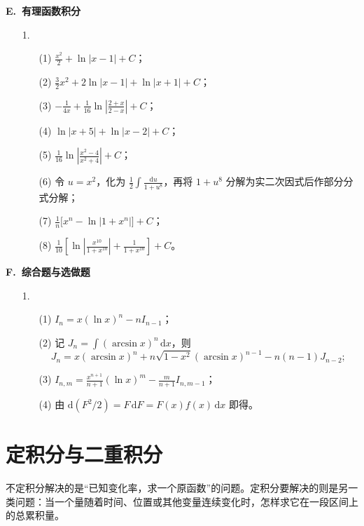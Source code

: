 \documentclass[fontset=fandol]{ctexart}
\newcommand{\dd}{\mathrm{d}}
\begin{document}
\textbf{E.\ 有理函数积分}

\begin{enumerate}
\item[1.]
\begin{enumerate}
\item[(1)] $\displaystyle \frac{x^2}{2}+\ln|x-1|+C$；
\item[(2)] $\displaystyle \frac32x^2+2\ln|x-1|+\ln|x+1|+C$；
\item[(3)] $\displaystyle -\frac1{4x}+\frac1{16}\ln\left|\frac{2+x}{2-x}\right|+C$；
\item[(4)] $\ln|x+5|+\ln|x-2|+C$；
\item[(5)] $\displaystyle \frac1{16}\ln\left|\frac{x^2-4}{x^2+4}\right|+C$；
\item[(6)] 令 $u=x^2$，化为 $\displaystyle \frac12\int\frac{\dd u}{1+u^8}$，再将 $1+u^8$ 分解为实二次因式后作部分分式分解；
\item[(7)] $\displaystyle \frac1n\bigl[x^n-\ln|1+x^n|\bigr]+C$；
\item[(8)] $\displaystyle \frac1{10}\left[\ln\left|\frac{x^{10}}{1+x^{10}}\right|+\frac1{1+x^{10}}\right]+C$。
\end{enumerate}
\end{enumerate}

\textbf{F.\ 综合题与选做题}

\begin{enumerate}
\item[1.]
\begin{enumerate}
\item[(1)] $\displaystyle I_n=x(\ln x)^n-nI_{n-1}$；
\item[(2)] 记 $J_n=\int(\arcsin x)^n\,\dd x$，则
\[
J_n=x(\arcsin x)^n+n\sqrt{1-x^2}(\arcsin x)^{n-1}-n(n-1)J_{n-2};
\]
\item[(3)] $\displaystyle I_{n,m}=\frac{x^{n+1}}{n+1}(\ln x)^m-\frac{m}{n+1}I_{n,m-1}$；
\item[(4)] 由 $\dd\!\left(F^2/2\right)=F\,\dd F=F(x)f(x)\,\dd x$ 即得。
\end{enumerate}
\end{enumerate}


\fi


\clearpage
\section{定积分与二重积分}

不定积分解决的是“已知变化率，求一个原函数”的问题。定积分要解决的则是另一类问题：当一个量随着时间、位置或其他变量连续变化时，怎样求它在一段区间上的总累积量。
\end{document}
